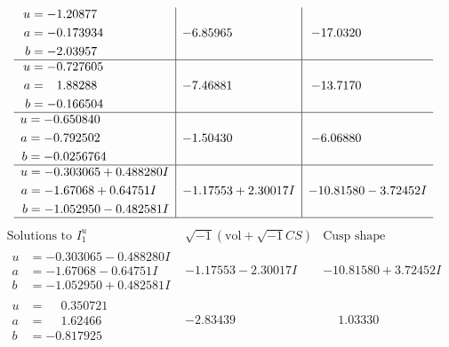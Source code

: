 \documentclass[1p]{elsarticle_modified}
\theoremstyle{definition}
\newcommand{\I}{\sqrt{-1}}
\begin{document}
$$\begin{array}{c|c|c}
\begin{aligned}
u &= -1.20877\phantom{ +0.000000I} \\
a &= -0.173934\phantom{ +0.000000I} \\
b &= -2.03957\phantom{ +0.000000I}\end{aligned}
 & -6.85965\phantom{ +0.000000I} & -17.0320\phantom{ +0.000000I} \\ \hline\begin{aligned}
u &= -0.727605\phantom{ +0.000000I} \\
a &= \phantom{-}1.88288\phantom{ +0.000000I} \\
b &= -0.166504\phantom{ +0.000000I}\end{aligned}
 & -7.46881\phantom{ +0.000000I} & -13.7170\phantom{ +0.000000I} \\ \hline\begin{aligned}
u &= -0.650840\phantom{ +0.000000I} \\
a &= -0.792502\phantom{ +0.000000I} \\
b &= -0.0256764\phantom{ +0.000000I}\end{aligned}
 & -1.50430\phantom{ +0.000000I} & -6.06880\phantom{ +0.000000I} \\ \hline\begin{aligned}
u &= -0.303065 + 0.488280 I \\
a &= -1.67068 + 0.64751 I \\
b &= -1.052950 - 0.482581 I\end{aligned}
 & -1.17553 + 2.30017 I & -10.81580 - 3.72452 I\\
 \hline 
 \end{array}$$\newpage$$\begin{array}{c|c|c}  
\text{Solutions to }I^u_{1}& \I (\text{vol} + \sqrt{-1}CS) & \text{Cusp shape}\\
 \hline 
\begin{aligned}
u &= -0.303065 - 0.488280 I \\
a &= -1.67068 - 0.64751 I \\
b &= -1.052950 + 0.482581 I\end{aligned}
 & -1.17553 - 2.30017 I & -10.81580 + 3.72452 I \\ \hline\begin{aligned}
u &= \phantom{-}0.350721\phantom{ +0.000000I} \\
a &= \phantom{-}1.62466\phantom{ +0.000000I} \\
b &= -0.817925\phantom{ +0.000000I}\end{aligned}
 & -2.83439\phantom{ +0.000000I} & \phantom{-}1.03330\phantom{ +0.000000I} \\ \hline\begin{aligned}

\end{aligned}
\end{array}$$
\end{document}
